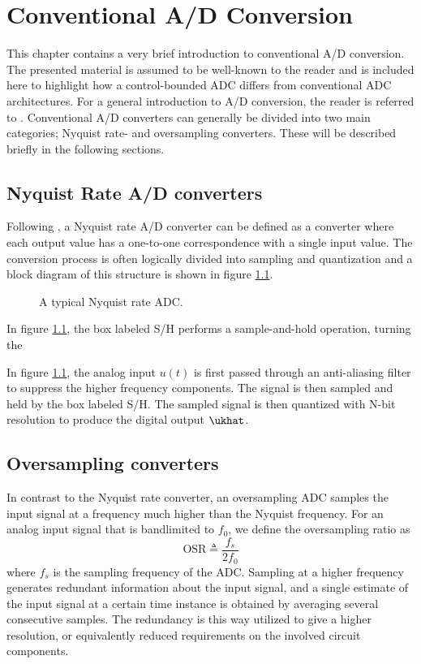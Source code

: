 
\chapter{Conventional A/D Conversion}
\label{sec:conventional_adc}
This chapter contains a very brief introduction to conventional A/D conversion. The presented material is assumed to be well-known to the reader and is included here to highlight how a control-bounded ADC differs from conventional ADC architectures. For a general introduction to A/D conversion, the reader is referred to \cite{johns_martin}. Conventional A/D converters can generally be divided into two main categories; Nyquist rate- and oversampling converters. These will be described briefly in the following sections.

\section{Nyquist Rate A/D converters}
Following \cite{johns_martin}, a Nyquist rate A/D converter can be defined as a converter where each output value has a one-to-one correspondence with a single input value. The conversion process is often logically divided into sampling and quantization and a block diagram of this structure is shown in figure \ref{fig:nyquist_rate_adc}.
\label{subsec:nyquist_adc}
\begin{figure}[htbp]
    
    \centering
    \caption{A typical Nyquist rate ADC.}
    \label{fig:nyquist_rate_adc}
\end{figure}

In figure \ref{fig:nyquist_rate_adc}, the box labeled S/H performs a sample-and-hold operation, turning the

In figure \ref{fig:nyquist_rate_adc}, the analog input $u(t)$ is first passed through an anti-aliasing filter to suppress the higher frequency components. The signal is then sampled and held by the box labeled S/H. The sampled signal is then quantized with N-bit resolution to produce the digital output $\ukhat$.

\section{Oversampling converters}
\label{subsec:oversampling_adc}
In contrast to the Nyquist rate converter, an oversampling ADC samples the input signal at a frequency much higher than the Nyquist frequency. For an analog input signal that is bandlimited to $f_0$, we define the oversampling ratio as
\begin{equation}
    \label{eq:osr_def}
    \text{OSR} \triangleq \frac{f_s}{2f_0}
\end{equation}
where $f_s$ is the sampling frequency of the ADC. Sampling at a higher frequency generates redundant information about the input signal, and a single estimate of the input signal at a certain time instance is obtained by averaging several consecutive samples. The redundancy is this way utilized to give a higher resolution, or equivalently reduced requirements on the involved circuit components.

